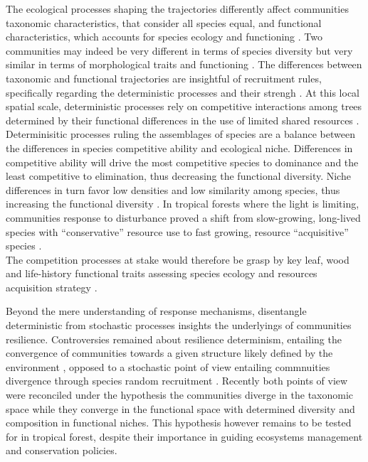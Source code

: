 \documentclass[fleqn,10pt]{ArtEcoFoG} %
\begin{document}
The ecological processes shaping the trajectories differently affect
communities taxonomic characteristics, that consider all species equal,
and functional characteristics, which accounts for species ecology and
functioning \citep{Violle2007b, Kunstler2016}. Two communities may
indeed be very different in terms of species diversity but very similar
in terms of morphological traits and functioning \citep{Villeger2012}.
The differences between taxonomic and functional trajectories are
insightful of recruitment rules, specifically regarding the
deterministic processes and their strengh
\citep{Mayfield2010, Fukami2005}. At this local spatial scale,
deterministic processes rely on competitive interactions among trees
determined by their functional differences in the use of limited shared
resources \citep{Webb2002, Perronne2017}. Determinisitic processes
ruling the assemblages of species are a balance between the differences
in species competitive ability and ecological niche. Differences in
competitive ability will drive the most competitive species to dominance
and the least competitive to elimination, thus decreasing the functional
diversity. Niche differences in turn favor low densities and low
similarity among species, thus increasing the functional diversity
\citep{Ackerly2003, McGill2006, Kunstler2012}. In tropical forests where
the light is limiting, communities response to disturbance proved a
shift from slow-growing, long-lived species with ``conservative''
resource use to fast growing, resource ``acquisitive'' species
\citep{Denslow1980, Molino2001, Bongers2009}.\\
The competition processes at stake would therefore be grasp by key leaf,
wood and life-history functional traits assessing species ecology and
resources acquisition strategy
\citep{Wright2004, Chave2009b, Herault2011, Gerhold2015}.

Beyond the mere understanding of response mechanisms, disentangle
deterministic from stochastic processes insights the underlyings of
communities resilience. Controversies remained about resilience
determinism, entailing the convergence of communities towards a given
structure likely defined by the environment \citep{Clements1916},
opposed to a stochastic point of view entailing commnuities divergence
through species random recruitment \citep{Diamond1975}. Recently both
points of view were reconciled under the hypothesis the communities
diverge in the taxonomic space while they converge in the functional
space with determined diversity and composition in functional niches.
This hypothesis however remains to be tested for in tropical forest,
despite their importance in guiding ecosystems management and
conservation policies.
\end{document}
